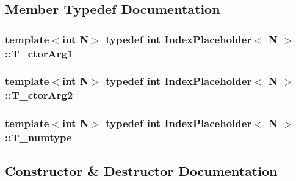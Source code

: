 \subsection{Member Typedef Documentation}
\hypertarget{classIndexPlaceholder_a6ea3b540cd6570da5b5cd10bb258e8cc}{}
\subsubsection[{T\+\_\+ctor\+Arg1}]{\setlength{\rightskip}{0pt plus 5cm}template$<$int N$>$ typedef int {\bf Index\+Placeholder}$<$ {\bf N} $>$\+::{\bf T\+\_\+ctor\+Arg1}}\label{classIndexPlaceholder_a6ea3b540cd6570da5b5cd10bb258e8cc}
\hypertarget{classIndexPlaceholder_a3142b177266f6c86d2d229ba69cac2d0}{}
\subsubsection[{T\+\_\+ctor\+Arg2}]{\setlength{\rightskip}{0pt plus 5cm}template$<$int N$>$ typedef int {\bf Index\+Placeholder}$<$ {\bf N} $>$\+::{\bf T\+\_\+ctor\+Arg2}}\label{classIndexPlaceholder_a3142b177266f6c86d2d229ba69cac2d0}
\hypertarget{classIndexPlaceholder_ad03df79ee5a3bed19e6a8de0dd67cc16}{}
\subsubsection[{T\+\_\+numtype}]{\setlength{\rightskip}{0pt plus 5cm}template$<$int N$>$ typedef int {\bf Index\+Placeholder}$<$ {\bf N} $>$\+::{\bf T\+\_\+numtype}}\label{classIndexPlaceholder_ad03df79ee5a3bed19e6a8de0dd67cc16}


\subsection{Constructor \& Destructor Documentation}
\hypertarget{classIndexPlaceholder_abb86f5feb838be57b819e7605702fbcc}{}
